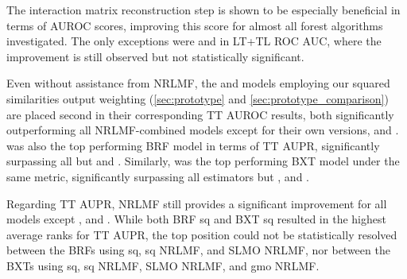 The interaction matrix reconstruction step is shown to be especially beneficial in terms of AUROC scores, improving this score for almost all forest algorithms investigated. The only exceptions were  and  in LT+TL ROC AUC, where the improvement is still observed but not statistically significant.
%
%

Even without assistance from NRLMF, the  and  models employing our squared similarities output weighting (\autoref{sec:prototype} and \autoref{sec:prototype_comparison}) are placed second in their corresponding TT AUROC results, both significantly outperforming all NRLMF-combined models except for their own versions,  and . %
 was also the top performing BRF model in terms of TT AUPR, significantly surpassing all but  and .
Similarly,  was the top performing BXT model under the same metric, significantly surpassing all estimators but ,  and .

Regarding TT AUPR, NRLMF still provides a significant improvement for all models except ,  and . While both BRF sq and BXT sq resulted in the highest average ranks for TT AUPR, the top position could not be statistically resolved between the BRFs using sq, sq NRLMF, and SLMO NRLMF, nor between the BXTs using sq, sq NRLMF, SLMO NRLMF, and gmo NRLMF.

